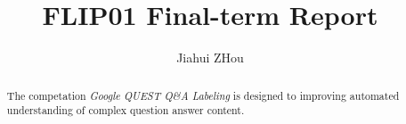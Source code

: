 \documentclass{amsart}
\begin{document}
%
%
\title[FLIP01 Report]{FLIP01 Final-term Report}%

\author{Jiahui ZHou}
\address[A.~1]{School of Computer Science,\\ 
Xi'an Shiyou University, Shaanxi 710065, China}%

%
%
\date{\gitAuthorDate}%

\begin{abstract}
The competation \textit{Google QUEST Q\&A Labeling} 
is designed to improving automated understanding of complex question answer content.

\end{abstract}

\maketitle
\tableofcontents

\newpage



\newpage



\listoftodos
\end{document}
